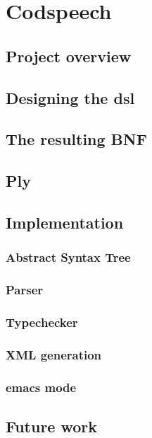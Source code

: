 \chapter{Codspeech}
\lipsum

\section{Project overview}

\section{Designing the dsl}

\section{The resulting BNF}


\section{Ply}

\section{Implementation}

\subsection{Abstract Syntax Tree}
\subsection{Parser}
\subsection{Typechecker}
\subsection{XML generation}
\subsection{emacs mode}

\section{Future work}
